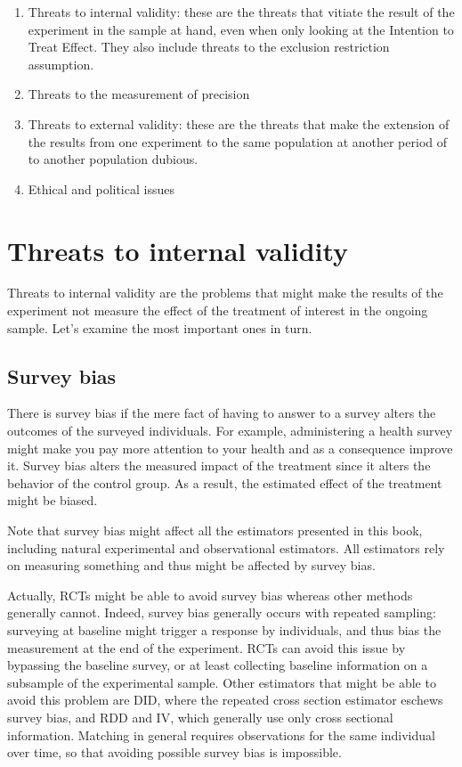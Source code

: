 \documentclass[]{book}
\providecommand{\tightlist}{%
  \setlength{\itemsep}{0pt}\setlength{\parskip}{0pt}}
\theoremstyle{definition}
\theoremstyle{definition}
\theoremstyle{definition}
\theoremstyle{remark}
\let\BeginKnitrBlock\begin \let\EndKnitrBlock\end
\begin{document}
\begin{enumerate}
\def\labelenumi{\arabic{enumi}.}
\tightlist
\item
  Threats to internal validity: these are the threats that vitiate the result of the experiment in the sample at hand, even when only looking at the Intention to Treat Effect.
  They also include threats to the exclusion restriction assumption.
\item
  Threats to the measurement of precision
\item
  Threats to external validity: these are the threats that make the extension of the results from one experiment to the same population at another period of to another population dubious.
\item
  Ethical and political issues
\end{enumerate}

\hypertarget{threats-to-internal-validity}{%
\section{Threats to internal validity}\label{threats-to-internal-validity}}

Threats to internal validity are the problems that might make the results of the experiment not measure the effect of the treatment of interest in the ongoing sample.
Let's examine the most important ones in turn.

\hypertarget{survey-bias}{%
\subsection{Survey bias}\label{survey-bias}}

There is survey bias if the mere fact of having to answer to a survey alters the outcomes of the surveyed individuals.
For example, administering a health survey might make you pay more attention to your health and as a consequence improve it.
Survey bias alters the measured impact of the treatment since it alters the behavior of the control group.
As a result, the estimated effect of the treatment might be biased.

\BeginKnitrBlock{remark}
\iffalse{} {Remark. } \fi{}Note that survey bias might affect all the estimators presented in this book, including natural experimental and observational estimators.
All estimators rely on measuring something and thus might be affected by survey bias.

Actually, RCTs might be able to avoid survey bias whereas other methods generally cannot.
Indeed, survey bias generally occurs with repeated sampling: surveying at baseline might trigger a response by individuals, and thus bias the measurement at the end of the experiment.
RCTs can avoid this issue by bypassing the baseline survey, or at least collecting baseline information on a subsample of the experimental sample.
Other estimators that might be able to avoid this problem are DID, where the repeated cross section estimator eschews survey bias, and RDD and IV, which generally use only cross sectional information.
Matching in general requires observations for the same individual over time, so that avoiding possible survey bias is impossible.
\EndKnitrBlock{remark}
\end{document}
